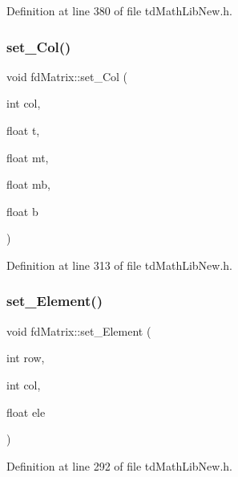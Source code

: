 Definition at line 380 of file td\+Math\+Lib\+New.\+h.

\hypertarget{classfd_matrix_a28f9ba15893b5b8b4571819c1135f44a}{}\label{classfd_matrix_a28f9ba15893b5b8b4571819c1135f44a} 
\subsubsection{\texorpdfstring{set\+\_\+\+Col()}{set\_Col()}}
{\footnotesize\ttfamily void fd\+Matrix\+::set\+\_\+\+Col (\begin{DoxyParamCaption}\item[{int}]{col,  }\item[{float}]{t,  }\item[{float}]{mt,  }\item[{float}]{mb,  }\item[{float}]{b }\end{DoxyParamCaption})\hspace{0.3cm}{\ttfamily [inline]}}



Definition at line 313 of file td\+Math\+Lib\+New.\+h.

\hypertarget{classfd_matrix_a8036052328d87b7b5af3c1e9ddbe3a6b}{}\label{classfd_matrix_a8036052328d87b7b5af3c1e9ddbe3a6b} 
\subsubsection{\texorpdfstring{set\+\_\+\+Element()}{set\_Element()}}
{\footnotesize\ttfamily void fd\+Matrix\+::set\+\_\+\+Element (\begin{DoxyParamCaption}\item[{int}]{row,  }\item[{int}]{col,  }\item[{float}]{ele }\end{DoxyParamCaption})\hspace{0.3cm}{\ttfamily [inline]}}



Definition at line 292 of file td\+Math\+Lib\+New.\+h.

\hypertarget{classfd_matrix_a7972da65e7020b48329e20a7f9e2436e}{}\label{classfd_matrix_a7972da65e7020b48329e20a7f9e2436e} 
